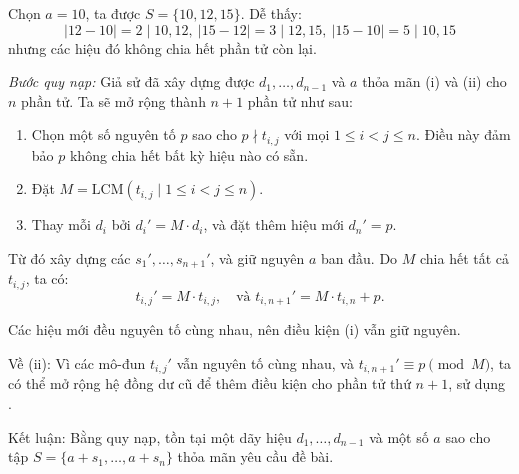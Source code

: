 \documentclass[../09-contruction-methods.tex]{subfiles}
\begin{document}
\begin{soln}
	Chọn \( a = 10 \), ta được \( S = \{10, 12, 15\} \).
	Dễ thấy: 
	\[ |12-10| = 2 \mid 10, 12,\  |15-12| = 3 \mid 12, 15,\ |15-10| = 5 \mid 10, 15 \]
	nhưng các hiệu đó không chia hết phần tử còn lại.
	
	\textit{Bước quy nạp:} Giả sử đã xây dựng được \( d_1, \dots, d_{n-1} \) và \( a \) thỏa mãn (i) và (ii) cho \( n \) phần tử. Ta sẽ mở rộng thành \( n+1 \) phần tử như sau:
	\begin{enumerate}[topsep=0pt, partopsep=0pt, itemsep=0pt, label=(\roman*)]
		\item Chọn một số nguyên tố \( p \) sao cho \( p \nmid t_{i,j} \) với mọi \( 1 \le i < j \le n \). Điều này đảm bảo \( p \) không chia hết bất kỳ hiệu nào có sẵn.
		\item Đặt \( M = \text{LCM} \left( t_{i,j} \mid 1 \le i < j \le n \right) \).
		\item Thay mỗi \( d_i \) bởi \( d_i' = M \cdot d_i \), và đặt thêm hiệu mới \( d_n' = p \).
	\end{enumerate}
	
	Từ đó xây dựng các \( s_1', \dots, s_{n+1}' \), và giữ nguyên \( a \) ban đầu.  
	Do \( M \) chia hết tất cả \( t_{i,j} \), ta có:
	\[
		t_{i,j}' = M \cdot t_{i,j}, \quad \text{và } t_{i,n+1}' = M \cdot t_{i,n} + p.
	\]
	
	Các hiệu mới đều nguyên tố cùng nhau, nên điều kiện (i) vẫn giữ nguyên.
	
	Về (ii): Vì các mô-đun \( t_{i,j}' \) vẫn nguyên tố cùng nhau, và \( t_{i,n+1}' \equiv p \pmod{M} \),
	ta có thể mở rộng hệ đồng dư cũ để thêm điều kiện cho phần tử thứ \( n+1 \), sử dụng .
	
	Kết luận: Bằng quy nạp, tồn tại một dãy hiệu \( d_1, \dots, d_{n-1} \) và một số \( a \) sao cho tập \( S = \{ a + s_1, \dots, a + s_n \} \) thỏa mãn yêu cầu đề bài.
\end{soln}

\end{document}
